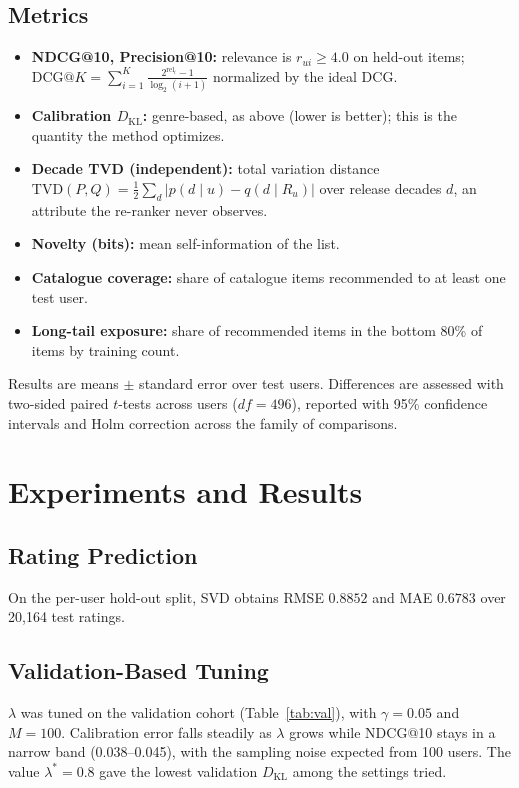 \documentclass[conference]{IEEEtran}
\newcommand{\KL}{D_{\mathrm{KL}}}
\newcommand{\TVD}{\mathrm{TVD}}
\begin{document}
  \subsection{Metrics}
  \begin{itemize}
    \item \textbf{NDCG@10, Precision@10:} relevance is $r_{ui}\ge4.0$ on held-out items; $\mathrm{DCG}@K=\sum_{i=1}^{K}\frac{2^{\mathrm{rel}_i}-1}{\log_2(i+1)}$ normalized by the ideal DCG.
    \item \textbf{Calibration $\KL$:} genre-based, as above (lower is better); this is the quantity the method optimizes.
    \item \textbf{Decade TVD (independent):} total variation distance $\TVD(P,Q)=\tfrac12\sum_{d}|p(d\mid u)-q(d\mid R_u)|$ over release decades $d$, an attribute the re-ranker never observes.
    \item \textbf{Novelty (bits):} mean self-information of the list.
    \item \textbf{Catalogue coverage:} share of catalogue items recommended to at least one test user.
    \item \textbf{Long-tail exposure:} share of recommended items in the bottom 80\% of items by training count.
  \end{itemize}
  Results are means $\pm$ standard error over test users. Differences are assessed with two-sided paired $t$-tests across users ($df=496$), reported with 95\% confidence intervals and Holm correction \cite{holm1979} across the family of comparisons.

  \section{Experiments and Results}\label{sec:exp}
  \subsection{Rating Prediction}
  On the per-user hold-out split, SVD obtains RMSE $0.8852$ and MAE $0.6783$ over 20{,}164 test ratings.

  \subsection{Validation-Based Tuning}
  $\lambda$ was tuned on the validation cohort (Table~\ref{tab:val}), with $\gamma=0.05$ and $M=100$. Calibration error falls steadily as $\lambda$ grows while NDCG@10 stays in a narrow band (0.038--0.045), with the sampling noise expected from 100 users. The value $\lambda^*=0.8$ gave the lowest validation $\KL$ among the settings tried.
\end{document}
